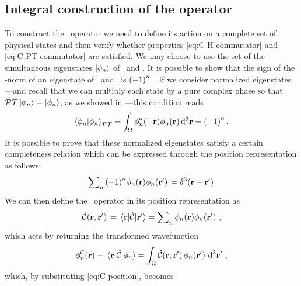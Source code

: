         \subsection{Integral construction of the \texorpdfstring{\hC}{C} operator}
            To construct the \hC\ operator we need to define its action on a complete set of physical states and then verify whether properties \eqref{eq:C-H-commutator} and \eqref{eq:C-PT-commutator} are satisfied. We may choose to use the set of the simultaneous eigenstates $\ket{\phi_n}$ of \hH\ and \hPT. It is possible to show that the sign of the \PT-norm of an eigenstate of \hH\ and \hPT\ is $\pqty{-1}^n$ \cite{bender2024}. If we consider normalized eigenstates---and recall that we can multiply each state by a pure complex phase so that $\mathcal{\hat{P}}\mathcal{\hat{T}}\ket{\phi_n} = \ket{\phi_n}$, as we showed in ---this condition reads \cite{Bender2002,bender2024}
            \begin{equation*}
                \braket{\phi_n}{\phi_n}_{\PT} 
                = \int\nolimits_\Omega \phi_n^*\pqty{-\vb{r}} \phi_n\pqty{\vb{r}} \dd[3]{\vb{r}}
                = \pqty{-1}^n
                \myperiod
            \end{equation*}
            It is possible to prove \cite{bender2024,Weigert2003} that these normalized eigenstates satisfy a certain completeness relation which can be expressed through the position representation as follows:
            \begin{equation}
                \sum\nolimits_n \pqty{-1}^n\phi_n\pqty{\vb{r}}\phi_n\pqty*{\vb{r}'} = \delta^3\pqty*{\vb{r}-\vb{r}'}
            \end{equation}
            We can then define the \hC\ operator in its position representation as
            \begin{equation}
                \label{eq:C-position}
                \hC\pqty*{\vb{r},\vb{r}'}
                = \mel{\vb{r}}{\hC}{\vb{r}'}
                = \sum\nolimits_n \phi_n\pqty{\vb{r}}\phi_n\pqty*{\vb{r}'}
                \mycomma
            \end{equation}
            which acts by returning the transformed wavefunction
            \begin{equation*}
                \phi_n^\mcC\pqty{\vb{r}}
                \equiv \mel{\vb{r}}{\hC}{\phi_n}
                = \int\nolimits_\Omega \hC\pqty*{\vb{r},\vb{r}'} \phi_n\pqty*{\vb{r}'} \dd[3]{\vb{r}'}
                \mycomma
            \end{equation*}
            which, by substituting \eqref{eq:C-position}, becomes
